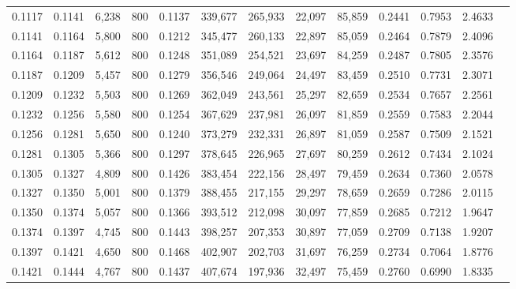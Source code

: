 \begin{tabular}{rrrrrrrrrrrrr}
0.1117 & 0.1141 &  6,238 &   800 &                                     0.1137 & 339,677 & 265,933 &  22,097 &  85,859 & 0.2441 & 0.7953 & 2.4633 \\
0.1141 & 0.1164 &  5,800 &   800 &                                     0.1212 & 345,477 & 260,133 &  22,897 &  85,059 & 0.2464 & 0.7879 & 2.4096 \\
0.1164 & 0.1187 &  5,612 &   800 &                                     0.1248 & 351,089 & 254,521 &  23,697 &  84,259 & 0.2487 & 0.7805 & 2.3576 \\
0.1187 & 0.1209 &  5,457 &   800 &                                     0.1279 & 356,546 & 249,064 &  24,497 &  83,459 & 0.2510 & 0.7731 & 2.3071 \\
0.1209 & 0.1232 &  5,503 &   800 &                                     0.1269 & 362,049 & 243,561 &  25,297 &  82,659 & 0.2534 & 0.7657 & 2.2561 \\
0.1232 & 0.1256 &  5,580 &   800 &                                     0.1254 & 367,629 & 237,981 &  26,097 &  81,859 & 0.2559 & 0.7583 & 2.2044 \\
0.1256 & 0.1281 &  5,650 &   800 &                                     0.1240 & 373,279 & 232,331 &  26,897 &  81,059 & 0.2587 & 0.7509 & 2.1521 \\
0.1281 & 0.1305 &  5,366 &   800 &                                     0.1297 & 378,645 & 226,965 &  27,697 &  80,259 & 0.2612 & 0.7434 & 2.1024 \\
0.1305 & 0.1327 &  4,809 &   800 &                                     0.1426 & 383,454 & 222,156 &  28,497 &  79,459 & 0.2634 & 0.7360 & 2.0578 \\
0.1327 & 0.1350 &  5,001 &   800 &                                     0.1379 & 388,455 & 217,155 &  29,297 &  78,659 & 0.2659 & 0.7286 & 2.0115 \\
0.1350 & 0.1374 &  5,057 &   800 &                                     0.1366 & 393,512 & 212,098 &  30,097 &  77,859 & 0.2685 & 0.7212 & 1.9647 \\
0.1374 & 0.1397 &  4,745 &   800 &                                     0.1443 & 398,257 & 207,353 &  30,897 &  77,059 & 0.2709 & 0.7138 & 1.9207 \\
0.1397 & 0.1421 &  4,650 &   800 &                                     0.1468 & 402,907 & 202,703 &  31,697 &  76,259 & 0.2734 & 0.7064 & 1.8776 \\
0.1421 & 0.1444 &  4,767 &   800 &                                     0.1437 & 407,674 & 197,936 &  32,497 &  75,459 & 0.2760 & 0.6990 & 1.8335 \\

\end{tabular}
